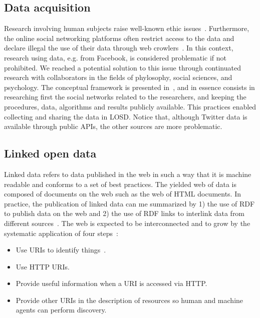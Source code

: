 \documentclass[journal,article,submit,moreauthors,pdftex]{Definitions/mdpi}
\begin{document}
\subsection{Data acquisition}\label{acq}
Research involving human subjects raise well-known ethic issues~\cite{}.
Furthermore, the online social networking platforms often restrict access
to the data and declare illegal the use of their data through web crowlers~\cite{ile1,ile2}.
In this context, research using data, e.g. from Facebook, is considered
problematic if not prohibited.
We reached a potential solution to this issue through continuated research with
collaborators in the fields of phylosophy, social sciences, and psychology.
The conceptual framework is presented in~\cite{antphy,antphy2}, and in essence
consists in researching first the social networks related to the researchers,
and keeping the procedures, data, algorithms and results publicly available.
This practices enabled collecting and sharing the data in LOSD.
Notice that, although Twitter data is available through public APIs, the other sources are more problematic.


\subsection{Linked open data}
Linked data refers to data published in the web in such a way that it is
machine readable and conforms to a set of best practices.
The yielded web of data is composed of documents on the web
such as the web of HTML documents.
In practice, the publication of linked data can me summarized
by 1) the use of RDF to publish data on the web and 2) the use of RDF
links to interlink data from different sources~\cite{ld1,ld2}.
The web is expected to be interconnected and to grow by the systematic application of four
steps~\cite{lee1}:
\begin{itemize}
    \item Use URIs to identify things~\cite{uri}.
    \item Use HTTP URIs.
    \item Provide useful information when a URI is accessed via HTTP.
    \item Provide other URIs in the description of resources so human
        and machine agents can perform discovery.
\end{itemize}
\end{document}
